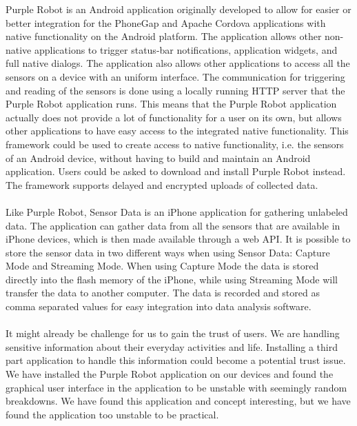 
Purple Robot \parencite{purple_robot} is an Android application originally developed to allow for easier or better integration for the PhoneGap and Apache Cordova applications with native functionality on the Android platform. The application allows other non-native applications to trigger status-bar notifications, application widgets, and full native dialogs. The application also allows other applications to access all the sensors on a device with an uniform interface. 
The communication for triggering and reading of the sensors is done using a locally running HTTP server that the Purple Robot application runs. This means that the Purple Robot application actually does not provide a lot of functionality for a user on its own, but allows other applications to have easy access to the integrated native functionality.
This framework could be used to create access to native functionality, i.e. the sensors of an Android device, without having to build and maintain an Android application. Users could be asked to download and install Purple Robot instead. The framework supports delayed and encrypted uploads of collected data. 
\\\\
Like Purple Robot, Sensor Data is an iPhone application for gathering unlabeled data. The application can gather data from all the sensors that are available in iPhone devices, which is then made available through a web API. It is possible to store the sensor data in two different ways when using Sensor Data: Capture Mode and Streaming Mode. When using Capture Mode the data is stored directly into the flash memory of the iPhone, while using Streaming Mode will transfer the data to another computer. The data is recorded and stored as comma separated values for easy integration into data analysis software.
\\\\
It might already be challenge for us to gain the trust of users. We are handling sensitive information about their everyday activities and life. 
Installing a third part application to handle this information could become a potential trust issue. We have installed the Purple Robot application on our devices and found the graphical user interface in the application to be unstable with seemingly random breakdowns. We have found this application and concept interesting, but we have found the application too unstable to be practical.   

